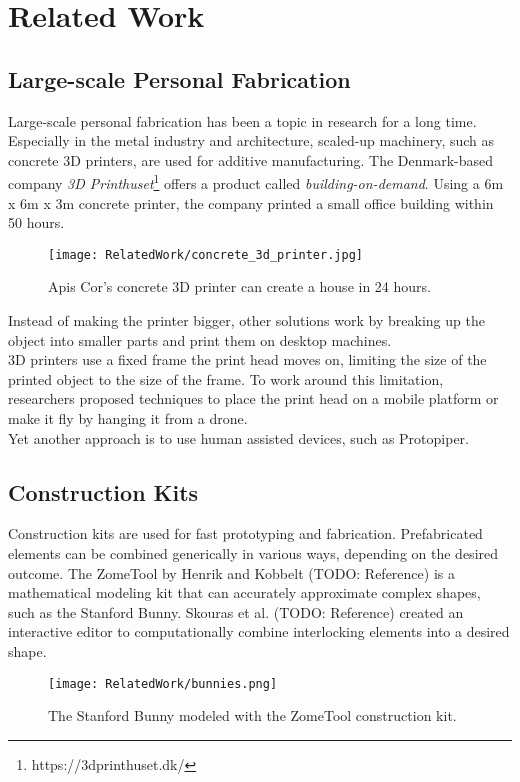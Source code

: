 \chapter{Related Work}\label{ch:relatedwork}
\section{Large-scale Personal Fabrication}
Large-scale personal fabrication has been a topic in research for a long time. Especially in the metal industry and architecture, scaled-up machinery, such as concrete 3D printers, are used for additive manufacturing. The Denmark-based company \textit{3D Printhuset}\footnote{https://3dprinthuset.dk/} offers a product called \textit{building-on-demand}. Using a 6m x 6m x 3m concrete printer, the company printed a small office building within 50 hours.\\
\begin{figure}[h!]
    \texttt{[image: RelatedWork/concrete\_3d\_printer.jpg]}
    \centering
    \caption{Apis Cor’s concrete 3D printer can create a house in 24 hours.}
    \label{fig:concrete_3d_printer}
\end{figure}
Instead of making the printer bigger, other solutions work by breaking up the object into smaller parts and print them on desktop machines.\\
3D printers use a fixed frame the print head moves on, limiting the size of the printed object to the size of the frame. To work around this limitation, researchers proposed techniques to place the print head on a mobile platform or make it fly by hanging it from a drone.\\
Yet another approach is to use human assisted devices, such as Protopiper.

\section{Construction Kits}
Construction kits are used for fast prototyping and fabrication. Prefabricated elements can be combined generically in various ways, depending on the desired outcome. The ZomeTool by Henrik and Kobbelt (TODO: Reference) is a mathematical modeling kit that can accurately approximate complex shapes, such as the Stanford Bunny. Skouras et al. (TODO: Reference) created an interactive editor to computationally combine interlocking elements into a desired shape.
\begin{figure}[h!]
    \texttt{[image: RelatedWork/bunnies.png]}
    \centering
    \caption{The Stanford Bunny modeled with the ZomeTool construction kit.}
    \label{fig:bunnies}
\end{figure}

